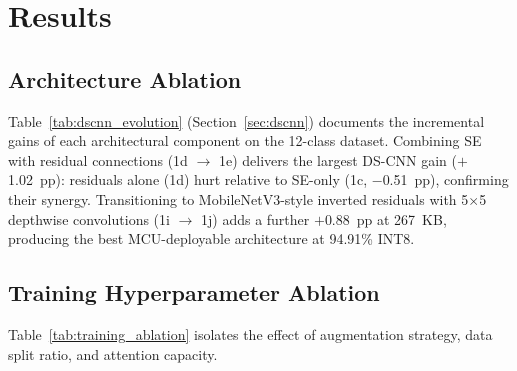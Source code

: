\documentclass[final,5p,times,twocolumn,nolinenum]{elsarticle}
\begin{document}
\section{Results}
\label{sec:results}

\subsection{Architecture Ablation}
\label{sec:ablation}

Table~\ref{tab:dscnn_evolution} (Section~\ref{sec:dscnn}) documents the
incremental gains of each architectural component on the 12-class dataset.
Combining SE with residual connections (1d $\to$ 1e) delivers the largest
DS-CNN gain ($+$1.02~pp): residuals alone (1d) hurt relative to SE-only
(1c, $-$0.51~pp), confirming their synergy. Transitioning to
MobileNetV3-style inverted residuals with 5$\times$5 depthwise convolutions
(1i $\to$ 1j) adds a further $+$0.88~pp at 267~KB, producing the best
MCU-deployable architecture at 94.91\% INT8.

\subsection{Training Hyperparameter Ablation}

Table~\ref{tab:training_ablation} isolates the effect of augmentation
strategy, data split ratio, and attention capacity.
\end{document}
